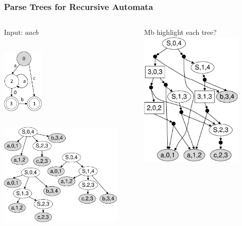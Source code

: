 \documentclass{beamer}
\begin{document}
	\begin{frame} 
		\frametitle{Parse Trees for Recursive Automata}
		\begin{columns}
			\begin{column}{6cm}
				\begin{column}{3cm}
				Input: $aacb$
				\end{column}
				\begin{column}{2cm}
					\includegraphics[width=2cm]{pictures/G0minimizedAutomaton.pdf}
				\end{column}
				\vspace{-20pt}
				\includegraphics[width=6cm]{pictures/G0trees.pdf}
			\end{column}
			\begin{column}{6cm}
				Mb highlight each tree?\\
				\includegraphics[width=5cm]{pictures/G0SPPF.pdf}
			\end{column}
		\end{columns}

	\end{frame}
	\fi
	
\end{document}
